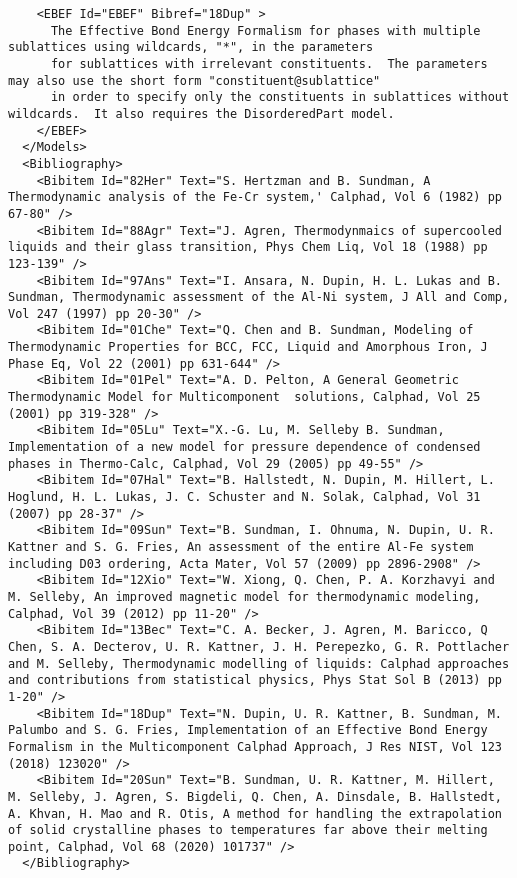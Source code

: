 \documentclass{article}
\begin{document}
\begin{appendices}
{\begin{verbatim}
    <EBEF Id="EBEF" Bibref="18Dup" > 
      The Effective Bond Energy Formalism for phases with multiple sublattices using wildcards, "*", in the parameters
      for sublattices with irrelevant constituents.  The parameters may also use the short form "constituent@sublattice" 
      in order to specify only the constituents in sublattices without wildcards.  It also requires the DisorderedPart model.
    </EBEF>
  </Models>
  <Bibliography> 
    <Bibitem Id="82Her" Text="S. Hertzman and B. Sundman, A Thermodynamic analysis of the Fe-Cr system,' Calphad, Vol 6 (1982) pp 67-80" />
    <Bibitem Id="88Agr" Text="J. Agren, Thermodynmaics of supercooled liquids and their glass transition, Phys Chem Liq, Vol 18 (1988) pp 123-139" />
    <Bibitem Id="97Ans" Text="I. Ansara, N. Dupin, H. L. Lukas and B. Sundman, Thermodynamic assessment of the Al-Ni system, J All and Comp, Vol 247 (1997) pp 20-30" />
    <Bibitem Id="01Che" Text="Q. Chen and B. Sundman, Modeling of Thermodynamic Properties for BCC, FCC, Liquid and Amorphous Iron, J Phase Eq, Vol 22 (2001) pp 631-644" />
    <Bibitem Id="01Pel" Text="A. D. Pelton, A General Geometric Thermodynamic Model for Multicomponent  solutions, Calphad, Vol 25 (2001) pp 319-328" />
    <Bibitem Id="05Lu" Text="X.-G. Lu, M. Selleby B. Sundman, Implementation of a new model for pressure dependence of condensed phases in Thermo-Calc, Calphad, Vol 29 (2005) pp 49-55" />
    <Bibitem Id="07Hal" Text="B. Hallstedt, N. Dupin, M. Hillert, L. Hoglund, H. L. Lukas, J. C. Schuster and N. Solak, Calphad, Vol 31 (2007) pp 28-37" />
    <Bibitem Id="09Sun" Text="B. Sundman, I. Ohnuma, N. Dupin, U. R. Kattner and S. G. Fries, An assessment of the entire Al-Fe system including D03 ordering, Acta Mater, Vol 57 (2009) pp 2896-2908" />
    <Bibitem Id="12Xio" Text="W. Xiong, Q. Chen, P. A. Korzhavyi and M. Selleby, An improved magnetic model for thermodynamic modeling, Calphad, Vol 39 (2012) pp 11-20" />
    <Bibitem Id="13Bec" Text="C. A. Becker, J. Agren, M. Baricco, Q Chen, S. A. Decterov, U. R. Kattner, J. H. Perepezko, G. R. Pottlacher and M. Selleby, Thermodynamic modelling of liquids: Calphad approaches and contributions from statistical physics, Phys Stat Sol B (2013) pp 1-20" />
    <Bibitem Id="18Dup" Text="N. Dupin, U. R. Kattner, B. Sundman, M. Palumbo and S. G. Fries, Implementation of an Effective Bond Energy Formalism in the Multicomponent Calphad Approach, J Res NIST, Vol 123 (2018) 123020" />
    <Bibitem Id="20Sun" Text="B. Sundman, U. R. Kattner, M. Hillert, M. Selleby, J. Agren, S. Bigdeli, Q. Chen, A. Dinsdale, B. Hallstedt, A. Khvan, H. Mao and R. Otis, A method for handling the extrapolation of solid crystalline phases to temperatures far above their melting point, Calphad, Vol 68 (2020) 101737" />
  </Bibliography>


\end{verbatim}}
\end{appendices}
\end{document}
